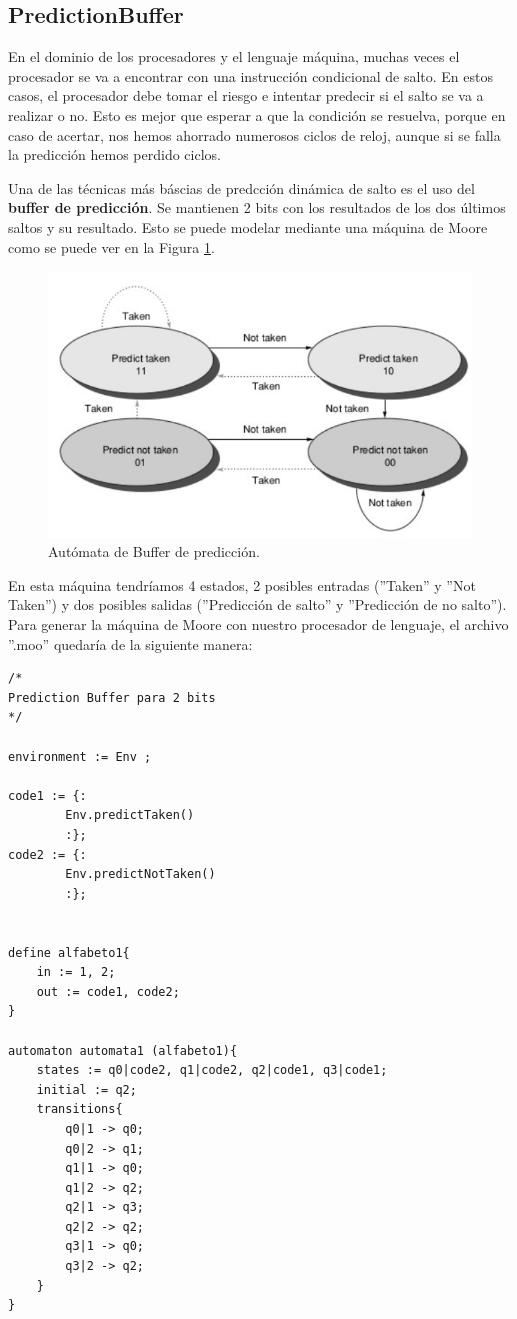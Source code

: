 \documentclass{pre-tfg}
\begin{document}
\subsection{PredictionBuffer} \label{sec:predbuff}
En el dominio de los procesadores y el lenguaje máquina, muchas veces el procesador se va a encontrar con una instrucción condicional de salto. En estos casos, el procesador debe tomar el riesgo e intentar predecir si el salto se va a realizar o no. Esto es mejor que esperar a que la condición se resuelva, porque en caso de acertar, nos hemos ahorrado numerosos ciclos de reloj, aunque si se falla la predicción hemos perdido ciclos.

Una de las técnicas más báscias de predcción dinámica de salto es el uso del \textbf{buffer de predicción}. Se mantienen 2 bits con los resultados de los dos últimos saltos y su resultado. Esto se puede modelar mediante una máquina de Moore como se puede ver en la Figura \ref{fig:PB}.

\begin{figure}[htb]
	\centering
	\includegraphics[width=12cm]{figures/PredictionBuffer.png}
	\caption{Autómata de Buffer de predicción.}
	\label{fig:PB}
\end{figure}

En esta máquina tendríamos 4 estados, 2 posibles entradas (''Taken'' y ''Not Taken'') y dos posibles salidas (''Predicción de salto'' y ''Predicción de no salto''). Para generar la máquina de Moore con nuestro procesador de lenguaje, el archivo ''.moo'' quedaría de la siguiente manera:

\begin{lstlisting}[caption=PredictionBuffer.moo.]
/* 
Prediction Buffer para 2 bits
*/

environment := Env ;

code1 := {: 
        Env.predictTaken()
        :};
code2 := {:
        Env.predictNotTaken()
        :};


define alfabeto1{
    in := 1, 2;
    out := code1, code2;
}

automaton automata1 (alfabeto1){
    states := q0|code2, q1|code2, q2|code1, q3|code1;
    initial := q2;
    transitions{
        q0|1 -> q0;
        q0|2 -> q1;
        q1|1 -> q0;
        q1|2 -> q2;
        q2|1 -> q3;
        q2|2 -> q2;
        q3|1 -> q0;
        q3|2 -> q2;
    }
}
\end{lstlisting}
\end{document}
